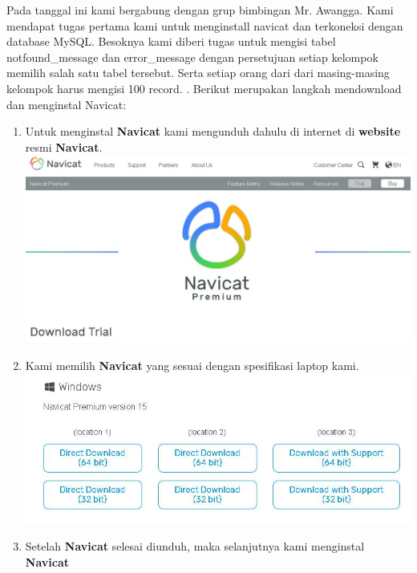 \documentclass{article}
\begin{document}
Pada tanggal ini kami bergabung dengan grup bimbingan Mr. Awangga. Kami mendapat tugas pertama kami untuk menginstall navicat dan terkoneksi dengan database MySQL. Besoknya kami diberi tugas untuk mengisi tabel notfound\_message dan error\_message dengan persetujuan setiap kelompok memilih salah satu tabel tersebut. Serta setiap orang dari dari masing-masing kelompok harus mengisi 100 record. . Berikut merupakan langkah mendownload dan menginstal Navicat:
\newline
\begin{enumerate}
        \item Untuk menginstal \textbf{Navicat} kami mengunduh dahulu di internet di \textbf{website} resmi \textbf{Navicat}.
        \newline
        \includegraphics[scale=0.3]{26.1.jpg}
        \newline
        \item Kami memilih \textbf{Navicat} yang sesuai dengan spesifikasi laptop kami.
        \newline
        \includegraphics[scale=0.5]{26.2.jpg}
        \newline
        \item Setelah \textbf{Navicat} selesai diunduh, maka selanjutnya kami menginstal \textbf{Navicat}
        \newline

\end{enumerate}
\end{document}
